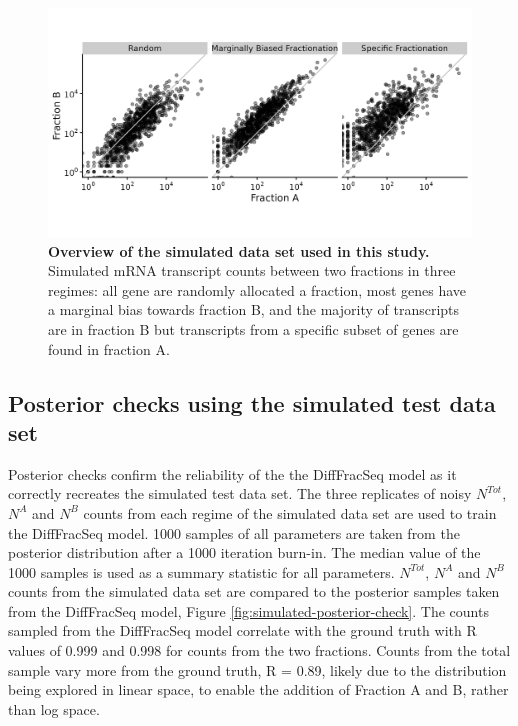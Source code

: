 \documentclass[../main.tex]{subfiles}
\begin{document}
\begin{figure}

{\centering \includegraphics[width=0.8\linewidth]{figures/fractionation_simulated_dataset_summary.png} 

}

\caption[Summary of simulated test data set.]{\textbf{Overview of the simulated data set used in this study.} Simulated mRNA transcript counts between two fractions in three regimes: all gene are randomly allocated a fraction, most genes have a marginal bias towards fraction B, and the majority of transcripts are in fraction B but transcripts from a specific subset of genes are found in fraction A.} \label{fig:fractionation-simulated-datasets}
\end{figure}

\subsection{Posterior checks using the simulated test data set}

Posterior checks confirm the reliability of the the DiffFracSeq model as it correctly recreates the simulated test data set. 
The three replicates of noisy $N^{Tot}$, $N^{A}$ and $N^{B}$ counts from each regime of the simulated data set are used to train the DiffFracSeq model.
1000 samples of all parameters are taken from the posterior distribution after a 1000 iteration burn-in.
The median value of the 1000 samples is used as a summary statistic for all parameters.
$N^{Tot}$, $N^{A}$ and $N^{B}$ counts from the simulated data set are compared to the posterior samples taken from the DiffFracSeq model, Figure \ref{fig:simulated-posterior-check}. 
The counts sampled from the DiffFracSeq model correlate with the ground truth with R values of 0.999 and 0.998 for counts from the two fractions.
Counts from the total sample vary more from the ground truth, R = 0.89, likely due to the distribution being explored in linear space, to enable the addition of Fraction A and B, rather than log space.
\end{document}
